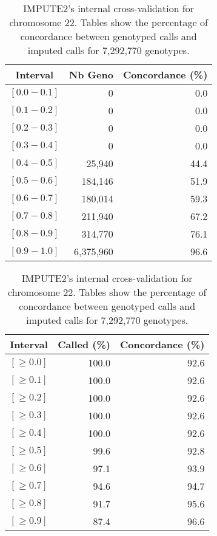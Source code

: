 \documentclass[10pt,twoside,english]{scrartcl}
\begin{document}
\begin{table}[H]
\protect\caption{IMPUTE2's internal cross-validation for chromosome 22. Tables show the
percentage of concordance between genotyped calls and imputed calls
for 7,292,770 genotypes.\label{tab:cross_validation_chr_22}}

\centering

\begin{tabular}{crr}
\hline 
\multicolumn{1}{c}{\textbf{Interval}}
 & \multicolumn{1}{c}{\textbf{Nb Geno}}
 & \multicolumn{1}{c}{\textbf{Concordance (\%)}}
\\
\hline 

$[0.0-0.1]$ & 0 & 0.0\\
$[0.1-0.2]$ & 0 & 0.0\\
$[0.2-0.3]$ & 0 & 0.0\\
$[0.3-0.4]$ & 0 & 0.0\\
$[0.4-0.5]$ & 25,940 & 44.4\\
$[0.5-0.6]$ & 184,146 & 51.9\\
$[0.6-0.7]$ & 180,014 & 59.3\\
$[0.7-0.8]$ & 211,940 & 67.2\\
$[0.8-0.9]$ & 314,770 & 76.1\\
$[0.9-1.0]$ & 6,375,960 & 96.6\\
\hline 
\end{tabular}
\hfill
\begin{tabular}{crr}
\hline 
\multicolumn{1}{c}{\textbf{Interval}}
 & \multicolumn{1}{c}{\textbf{Called (\%)}}
 & \multicolumn{1}{c}{\textbf{Concordance (\%)}}
\\
\hline 

$[\geq 0.0]$ & 100.0 & 92.6\\
$[\geq 0.1]$ & 100.0 & 92.6\\
$[\geq 0.2]$ & 100.0 & 92.6\\
$[\geq 0.3]$ & 100.0 & 92.6\\
$[\geq 0.4]$ & 100.0 & 92.6\\
$[\geq 0.5]$ & 99.6 & 92.8\\
$[\geq 0.6]$ & 97.1 & 93.9\\
$[\geq 0.7]$ & 94.6 & 94.7\\
$[\geq 0.8]$ & 91.7 & 95.6\\
$[\geq 0.9]$ & 87.4 & 96.6\\
\hline 
\end{tabular}


\end{table}
\end{document}
